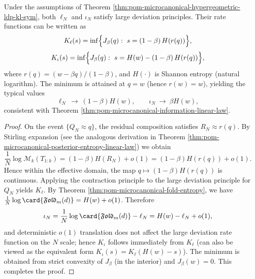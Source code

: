 \begin{theorem}\label{thm:pom-microcanonical-moduli-information-ldp}
Under the assumptions of Theorem \ref{thm:pom-microcanonical-hypergeometric-ldp-kl-sym}, both \(\ell_N\) and \(\iota_N\) satisfy large deviation principles.
Their rate functions can be written as
\[
K_\ell(s)=\inf\Bigl\{J_\beta(q):\ s=(1-\beta)\,H(r(q))\Bigr\},
\]
\[
K_\iota(s)=\inf\Bigl\{J_\beta(q):\ s=H(w)-(1-\beta)\,H(r(q))\Bigr\},
\]
where \(r(q)=(w-\beta q)/(1-\beta)\), and \(H(\cdot)\) is Shannon entropy (natural logarithm).
The minimum is attained at \(q=w\) (hence \(r(w)=w\)), yielding the typical values
\[
\ell_N\ \to\ (1-\beta)H(w),
\qquad
\iota_N\ \to\ \beta H(w),
\]
consistent with Theorem \ref{thm:pom-microcanonical-information-linear-law}.
\end{theorem}
\begin{proof}
On the event \(\{Q_N\approx q\}\), the residual composition satisfies \(R_N\approx r(q)\).
By Stirling expansion (see the analogous derivation in Theorem \ref{thm:pom-microcanonical-posterior-entropy-linear-law}) we obtain
\[
\frac{1}{N}\log\mathcal{M}_k(T_{1:k})
=(1-\beta)H(R_N)+o(1)
=(1-\beta)H(r(q))+o(1).
\]
Hence within the effective domain, the map \(q\mapsto (1-\beta)H(r(q))\) is continuous.
Applying the contraction principle to the large deviation principle for \(Q_N\) yields \(K_\ell\).
By Theorem \ref{thm:pom-microcanonical-fold-entropy}, we have \(\frac{1}{N}\log\card{\mathfrak{Fold}_m(d)}=H(w)+o(1)\).
Therefore
\[
\iota_N=\frac{1}{N}\log\card{\mathfrak{Fold}_m(d)}-\ell_N
=H(w)-\ell_N+o(1),
\]
and deterministic \(o(1)\) translation does not affect the large deviation rate function on the \(N\) scale;
hence \(K_\iota\) follows immediately from \(K_\ell\) (can also be viewed as the equivalent form \(K_\iota(s)=K_\ell(H(w)-s)\)).
The minimum is obtained from strict convexity of \(J_\beta\) (in the interior) and \(J_\beta(w)=0\). This completes the proof.
\end{proof}

